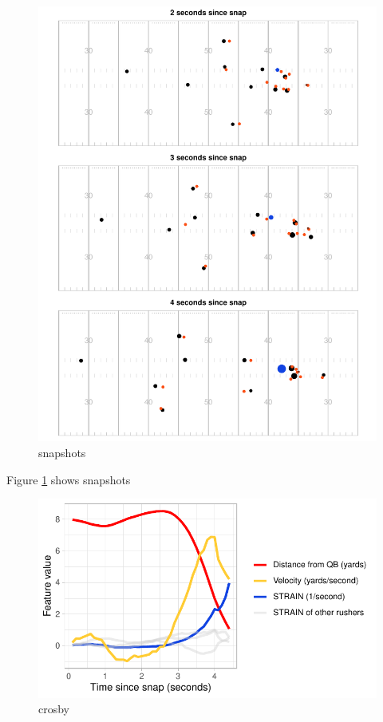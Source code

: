 \documentclass{statsoc}
\begin{document}
\begin{figure}

{\centering \includegraphics{paper_files/figure-latex/fig_field-1} 

}

\caption{snapshots}\label{fig:fig_field}
\end{figure}

Figure \ref{fig:fig_field} shows snapshots

\begin{figure}

{\centering \includegraphics{paper_files/figure-latex/fig_crosby_curves-1} 

}

\caption{crosby}\label{fig:fig_crosby_curves}
\end{figure}
\end{document}
